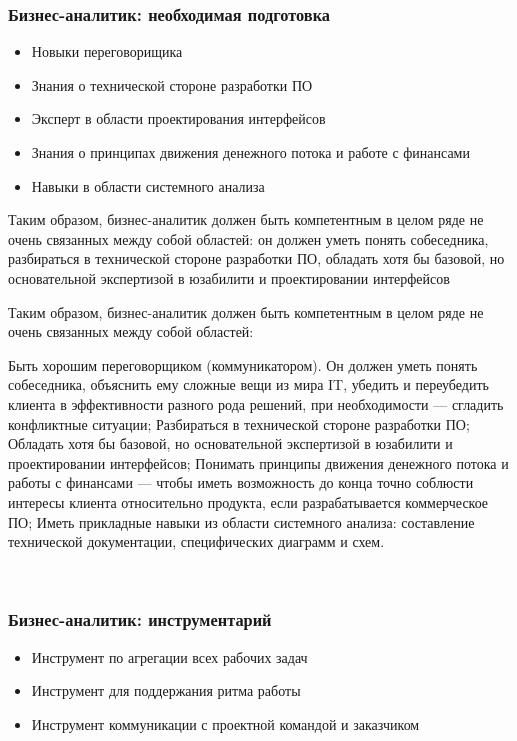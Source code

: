 \documentclass{../industrial-development}
\begin{document}
\begin{frame} \frametitle{Бизнес-аналитик: необходимая подготовка}
  \begin{itemize}
  \item Новыки переговорищика
  \item Знания о технической стороне разработки ПО
  \item Эксперт в области проектирования интерфейсов 
  \item Знания о принципах движения денежного потока и работе с финансами 
  \item Навыки в области системного анализа
  \end{itemize}
	\begin{block}{}
	\alert {}Таким образом, бизнес-аналитик должен быть компетентным в целом ряде не очень связанных между собой областей: он должен уметь понять собеседника, разбираться в технической стороне разработки ПО, обладать хотя бы базовой, но основательной экспертизой в юзабилити и проектировании интерфейсов
\end{block}
\end{frame}

\lecturenotes
Таким образом, бизнес-аналитик должен быть компетентным в целом ряде не очень связанных между собой областей:

Быть хорошим переговорщиком (коммуникатором). Он должен уметь понять собеседника, объяснить ему сложные вещи из мира IT, убедить и переубедить клиента в эффективности разного рода решений, при необходимости — сгладить конфликтные ситуации;
Разбираться в технической стороне разработки ПО;
Обладать хотя бы базовой, но основательной экспертизой в юзабилити и проектировании интерфейсов;
Понимать принципы движения денежного потока и работы с финансами — чтобы иметь возможность до конца точно соблюсти интересы клиента относительно продукта, если разрабатывается коммерческое ПО;
Иметь прикладные навыки из области системного анализа: составление технической документации, специфических диаграмм и схем.

 ~\cite{Business}

\begin{frame} \frametitle{Бизнес-аналитик: инструментарий}
  \begin{itemize}
  \item Инструмент по агрегации всех рабочих задач
  \item Инструмент для поддержания ритма работы
  \item Инструмент коммуникации с проектной командой и заказчиком
  \end{itemize}
\end{frame}
\end{document}
